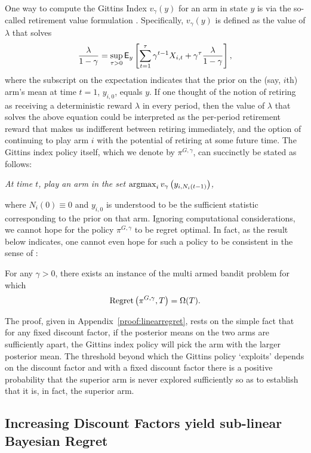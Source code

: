 One way to compute the Gittins Index $v_\gamma(y)$ for an arm in state $y$ is via the so-called retirement value formulation \citep{whittle1980multi}. Specifically, $v_\gamma(y)$ is defined as the value of $\lambda$ that solves
\begin{equation} \label{eqn:gittins_index}
\frac{\lambda}{1-\gamma} = \sup_{\tau > 0}\mathsf{E}_{y}\left[\sum_{t=1}^{\tau} \gamma^{t-1} X_{i,t} + \gamma^{\tau} \frac{\lambda}{1-\gamma}
\right],
\end{equation}
where the subscript on the expectation indicates that the prior on the (say, $i$th) arm's mean at time $t=1$, $y_{i,0}$, equals $y$. If one thought of the notion of retiring as receiving a deterministic reward $\lambda$ in every period, then the value of $\lambda$ that solves the above equation could be interpreted as the per-period retirement reward that makes us indifferent between retiring immediately, and the option of continuing to play arm $i$ with the potential of retiring at some future time. The Gittins index policy itself, which we denote by $\pi^{G,\gamma}$, can succinctly be stated as follows: 
\begin{center}
{\em At time $t$, play an arm in the set 
$\operatorname*{\mathrm{argmax}}_{i} v_\gamma
\left(
y_{i,N_i(t-1)}
\right)$,
} 
\end{center}
where $N_i(0) \equiv 0$ and $y_{i,0}$ is understood to be the sufficient statistic corresponding to the prior on that arm. Ignoring computational considerations, we cannot hope for the policy $\pi^{G,\gamma}$ to be regret optimal. In fact, as the result below indicates, one cannot even hope for such a policy to be consistent in the sense of \cite{lai1985asymptotically}:
\begin{lemma}
\label{le:linearregret}
	For any $\gamma > 0$, there exists an instance of the multi armed bandit problem for which 
	\[
	{\rm Regret}\left(
	\pi^{G,\gamma},T
	\right)
	= 
	\Omega(T).
	\]
\end{lemma}
The proof, given in Appendix~\ref{proof:linearregret}, rests on the simple fact that for any fixed discount factor, if the posterior means on the two arms are sufficiently apart, the Gittins index policy will pick the arm with the larger posterior mean. The threshold beyond which the Gittins policy `exploits' depends on the discount factor and with a fixed discount factor there is a positive probability that the superior arm is never explored sufficiently so as to establish that it is, in fact, the superior arm. 

\subsection{Increasing Discount Factors yield sub-linear Bayesian Regret}

